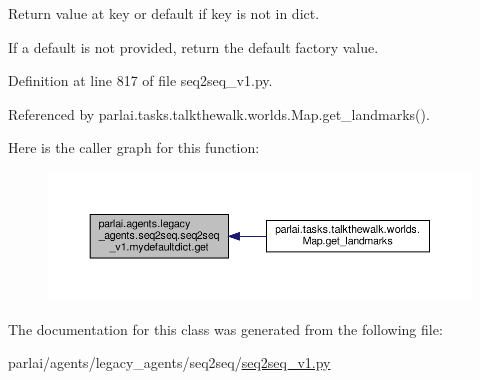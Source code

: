 \begin{DoxyVerb}Return value at key or default if key is not in dict.

If a default is not provided, return the default factory value.
\end{DoxyVerb}
 

Definition at line 817 of file seq2seq\+\_\+v1.\+py.



Referenced by parlai.\+tasks.\+talkthewalk.\+worlds.\+Map.\+get\+\_\+landmarks().

Here is the caller graph for this function\+:
\nopagebreak
\begin{figure}[H]
\begin{center}
\leavevmode
\includegraphics[width=350pt]{classparlai_1_1agents_1_1legacy__agents_1_1seq2seq_1_1seq2seq__v1_1_1mydefaultdict_aa078ac7ad7ce0d11a8aba0834acb4831_icgraph}
\end{center}
\end{figure}


The documentation for this class was generated from the following file\+:\begin{DoxyCompactItemize}
\item 
parlai/agents/legacy\+\_\+agents/seq2seq/\hyperlink{seq2seq__v1_8py}{seq2seq\+\_\+v1.\+py}\end{DoxyCompactItemize}
